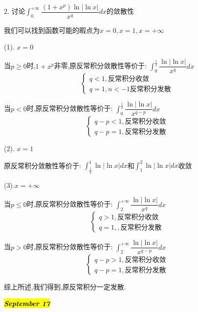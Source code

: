 2. 讨论$\int_{0}^{+\infty}\dfrac{(1+x^p)\ln|\ln x|}{x^q}dx$的敛散性
\begin{solution}

	我们可以找到函数可能的暇点为$x=0,x=1,x=+\infty$
	
	(1). $x=0$
	
	当$p\geq 0$时,$1+x^{p}$非零,原反常积分敛散性等价于:  $\int_{0}^{\frac{1}{2}}\dfrac{\ln|\ln x|}{x^q}dx$
	$$\left\lbrace
	\begin{array}{l}
		q<1,\text{反常积分收敛}\\
		q=1,n<-1\text{反常积分发散}
	\end{array}
	\right. $$
	
	当$p<0$时,原反常积分敛散性等价于:  $\int_{0}^{\frac{1}{2}}\dfrac{\ln|\ln x|}{x^{q-p}}dx$
	$$\left\lbrace
	\begin{array}{l}
		q-p<1,\text{反常积分收敛}\\
		q-p=1,\text{反常积分发散}
	\end{array}
	\right. $$
	
	(2). $x=1$
	
	原反常积分敛散性等价于:  $\int_{\frac{1}{2}}^{1}\ln|\ln x|dx$和$\int_{1}^{2}\ln|\ln x|dx$收敛
	
	(3).$x=+\infty$
	
	当$p\leq 0$时,原反常积分敛散性等价于:  $\int_{2}^{+\infty}\dfrac{\ln|\ln x|}{x^q}dx$
	$$\left\lbrace
	\begin{array}{l}
		q>1,\text{反常积分收敛}\\
		q=1,,\text{反常积分发散}
	\end{array}
	\right. $$
	
	当$p>0$时,原反常积分敛散性等价于:  $\int_{2}^{+\infty}\dfrac{\ln|\ln x|}{x^{q-p}}dx$
	$$\left\lbrace
	\begin{array}{l}
		q-p>1,\text{反常积分收敛}\\
		q-p=1,\text{反常积分发散}
	\end{array}
	\right. $$
	
	综上所述,我们得到,原反常积分一定发散.
	
\end{solution}

\hl{\textbf{\textit{September 17}}}

